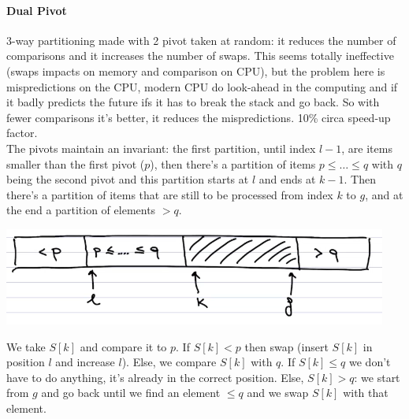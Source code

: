\documentclass[10pt]{report}
\begin{document}
\paragraph{Dual Pivot} 3-way partitioning made with 2 pivot taken at random: it reduces the number of comparisons and it increases the number of swaps. This seems totally ineffective (swaps impacts on memory and comparison on CPU), but the problem here is mispredictions on the CPU, modern CPU do look-ahead in the computing and if it badly predicts the future ifs it has to break the stack and go back. So with fewer comparisons it's better, it reduces the mispredictions. 10\% circa speed-up factor.\\
The pivots maintain an invariant: the first partition, until index $l-1$, are items smaller than the first pivot ($p$), then there's a partition of items $p\leq \ldots \leq q$ with $q$ being the second pivot and this partition starts at $l$ and ends at $k-1$. Then there's a partition of items that are still to be processed from index $k$ to $g$, and at the end a partition of elements $> q$.
\begin{center}
	\includegraphics[scale=1]{7.png}
\end{center}
We take $S[k]$ and compare it to $p$. If $S[k]<p$ then swap (insert $S[k]$ in position $l$ and increase $l$). Else, we compare $S[k]$ with $q$. If $S[k]\leq q$ we don't have to do anything, it's already in the correct position. Else, $S[k] > q$: we start from $g$ and go back until we find an element $\leq q$ and we swap $S[k]$ with that element.
\end{document}
